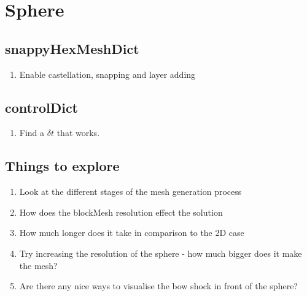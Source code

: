 \documentclass{article}
\begin{document}
\section{Sphere}

\subsection{snappyHexMeshDict}
\begin{enumerate}
\item Enable castellation, snapping and layer adding
\end{enumerate}

\subsection{controlDict}
\begin{enumerate}
\item Find a $\delta t$ that works.
\end{enumerate}

\subsection{Things to explore}
\begin{enumerate}
\item Look at the different stages of the mesh generation process
\item How does the blockMesh resolution effect the solution
\item How much longer does it take in comparison to the 2D case
\item Try increasing the resolution of the sphere - how much bigger does it make the mesh?
\item Are there any nice ways to visualise the bow shock in front of the sphere?
\end{enumerate}
\end{document}
